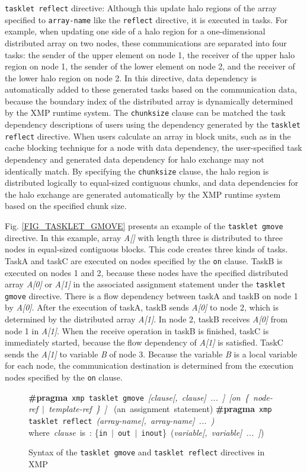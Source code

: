 ﻿\documentclass[graybox]{svmult}
\begin{document}
{\tt tasklet reflect} directive: Although this update halo regions of the array specified to {\tt array-name} like the {\tt reflect} directive, it is executed in tasks. For example, when updating one side of a halo region for a one-dimensional distributed array on two nodes, these communications are separated into four tasks: the sender of the upper element on node 1, the receiver of the upper halo region on node 1, the sender of the lower element on node 2, and the receiver of the lower halo region on node 2. In this directive, data dependency is automatically added to these generated tasks based on the communication data, because the boundary index of the distributed array is dynamically determined by the XMP runtime system. The {\tt chunksize} clause can be matched the task dependency descriptions of users using the dependency generated by the {\tt tasklet reflect} directive. When users calculate an array in block units, such as in the cache blocking technique for a node with data dependency, the user-specified task dependency and generated data dependency for halo exchange may not identically match. By specifying the {\tt chunksize} clause, the halo region is distributed logically to equal-sized contiguous chunks, and data dependencies for the halo exchange are generated automatically by the XMP runtime system based on the specified chunk size. 

Fig. \ref{FIG_TASKLET_GMOVE} presents an example of the {\tt tasklet gmove} directive. In this example, array {\it A[]} with length three is distributed to three nodes in equal-sized contiguous blocks. This code creates three kinds of tasks. TaskA and taskC are executed on nodes specified by the {\tt on} clause. TaskB is executed on nodes 1 and 2, because these nodes have the specified distributed array {\it A[0]} or {\it A[1]} in the associated assignment statement under the {\tt tasklet gmove} directive. There is a flow dependency between taskA and taskB on node 1 by {\it A[0]}. After the execution of taskA, taskB sends {\it A[0]} to node 2, which is determined by the distributed array {\it A[1]}. In node 2, taskB receives {\it A[0]} from node 1 in {\it A[1]}. When the receive operation in taskB is finished, taskC is immediately started, because the flow dependency of {\it A[1]} is satisfied. TaskC sends the {\it A[1]} to variable {\it B} of node 3. Because the variable {\it B} is a local variable for each node, the communication destination is determined from the execution nodes specified by the {\tt on} clause.

\begin{figure}[t]
\vbox{\scriptsize
\hbox{{\bf \#pragma} {\tt xmp tasklet gmove} {\it [clause[, clause] ... ]} {\it [on \{ node-ref $|$ template-ref \} ] }}
\hbox{\quad (an assignment statement)}
\hbox{}
\hbox{{\bf \#pragma} {\tt xmp tasklet reflect} {\it (array-name[, array-name] ... )}}
\hbox{\qquad\qquad\qquad\qquad{}}
\hbox{}
\hbox{\quad where {\it clause} is :}
\hbox{\qquad \{{\tt in} $|$ {\tt out} $|$ {\tt inout}\} ({\it variable[, variable] ... ]})}
}
\centerline{}
\caption{Syntax of the {\tt tasklet gmove} and {\tt tasklet reflect} directives in XMP}
\label{FIG_TASKLET_COMM}
\end{figure}
\end{document}

